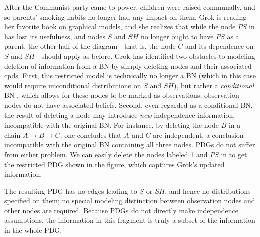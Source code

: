 \documentclass[letterpaper]{article} %
\theoremstyle{plain}
\theoremstyle{definition}
\theoremstyle{remark}
\begin{document}
\begin{example}[restriction]\label{ex:grok-ablate}
  After the Communist party came to power,
  children were raised communally, and so parents' smoking habits no longer had any impact on them. Grok is reading her favorite book on graphical models, and she realizes that while the node $\mathit{PS}$ in  has lost its usefulness, and nodes $S$ and $\mathit{SH}$ no longer ought to have $\mathit{PS}$ as a parent, the other half of the diagram---that is, the node $C$ and its dependence on $S$ and $\mathit{SH}$---should apply as before.
Grok has identified two obstacles to modeling deletion of information from a BN
by simply deleting nodes and their associated cpds. First, this restricted model
is technically no longer a BN (which in this case would require unconditional
distributions on $S$ and $\mathit{SH}$), but rather a \emph{conditional} BN
\cite{KF09}, which allows for these nodes to be marked as observations;
observation nodes do not have associated beliefs. Second, even regarded as a
conditional BN, the result of deleting a node may introduce \emph{new}
independence information, incompatible with the original BN. For instance, by
deleting the node $B$ in a chain $A \rightarrow B \rightarrow C$, one concludes
that $A$ and $C$ are independent, a conclusion incompatible with the original BN
containing all three nodes.   
PDGs do not suffer from either problem.  We can easily delete the
nodes labeled 1 and $PS$ in  to get the
restricted PDG shown in the figure, which captures Grok's updated information.
\begin{vfull}
The resulting PDG has no edges leading to $S$ or $\mathit{SH}$, and hence no
distributions specified on them; no special modeling distinction between
observation nodes and other nodes are required. Because PDGs do not directly
make independence assumptions, the information in this fragment is truly a
subset of the information in the whole PDG. 	
\end{vfull}
% 
\end{example}
\end{document}
